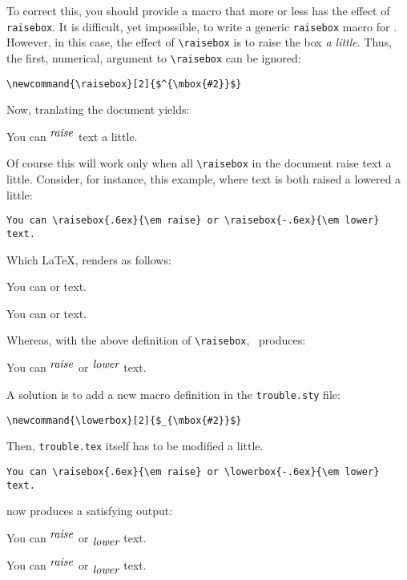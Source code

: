 \documentclass{article}
\begin{document}
To correct this, you should provide a macro that more or less has the effect of
\verb+raisebox+. It is difficult, yet impossible, to write a generic
\verb+raisebox+ macro for \htmlgen. However, in this case, the effect
of \verb+\raisebox+ is to raise the box {\em a little}.
Thus, the first, numerical, argument to \verb+\raisebox+  can be
ignored:
\begin{verbatim}
\newcommand{\raisebox}[2]{$^{\mbox{#2}}$}
\end{verbatim}

Now, tranlating the document yields:
\begin{htmlout}
\renewcommand{\raisebox}[2]{$^{\mbox{#2}}$}%
You can \raisebox{.6ex}{\em raise} text a little.
\end{htmlout}
Of course this will work only when all \verb+\raisebox+ in the document
raise text a little. Consider, for instance, this example, where text
is both raised a lowered a little:
\begin{verbatim}
You can \raisebox{.6ex}{\em raise} or \raisebox{-.6ex}{\em lower} text.
\end{verbatim}
Which \LaTeX, renders as follows:
\begin{htmlout}
\begin{htmlonly}
You can \raisebox{.6ex}{\em raise} or \raisebox{-.6ex}{\em lower} text.
\imageflush
\end{htmlonly}
\begin{latexonly}
You can \raisebox{.6ex}{\em raise} or \raisebox{-.6ex}{\em lower} text.
\end{latexonly}
\end{htmlout}
Whereas, with the above definition of \verb+\raisebox+, \htmlgen\ produces:
\begin{htmlout}
\renewcommand{\raisebox}[2]{$^{\mbox{#2}}$}%
You can \raisebox{.6ex}{\em raise} or \raisebox{-.6ex}{\em lower} text.
\end{htmlout}


A solution is to add a new macro definition in the \verb+trouble.sty+ file:
\begin{verbatim}
\newcommand{\lowerbox}[2]{$_{\mbox{#2}}$}
\end{verbatim}
Then, \verb+trouble.tex+ itself has to be modified a little.
\begin{verbatim}
You can \raisebox{.6ex}{\em raise} or \lowerbox{-.6ex}{\em lower} text.
\end{verbatim}
{\htmlgen} now produces a satisfying output:
\begin{htmlout}
\begin{latexonly}\renewcommand{\raisebox}[2]{$^{\mbox{#2}}$}%
\newcommand{\lowerbox}[2]{$_{\mbox{#2}}$}
You can \raisebox{.6ex}{\em raise} or \lowerbox{-.6ex}{\em lower} text.
\end{latexonly}
\begin{htmlonly}\newcommand{\raisebox}[2]{$^{\mbox{#2}}$}%
\newcommand{\lowerbox}[2]{$_{\mbox{#2}}$}
You can \raisebox{.6ex}{\em raise} or \lowerbox{-.6ex}{\em lower} text.
\end{htmlonly}
\end{htmlout}
\end{document}

